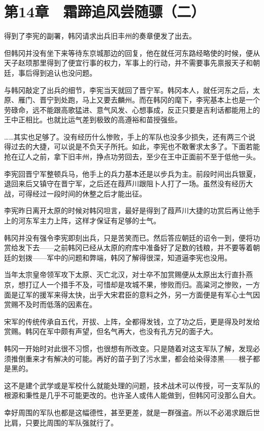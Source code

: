 \section{第14章　霜蹄追风尝随骠（二）}

得到了李宪的副署，韩冈请求出兵旧丰州的奏章便发了出去。

但韩冈并没有坐下来等待东京城那边的回复，他在就任河东路经略使的时候，便从天子赵顼那里得到了便宜行事的权力，军事上的行动，并不需要事先禀报天子和朝廷，事后得到追认也没问题。

与韩冈敲定了出兵的细节，李宪当天就回了晋宁军。韩冈本人，就任河东之后，太原、雁门、晋宁到处跑，马上又要去麟州。而在韩冈的麾下，李宪基本上也是一个劳碌命，远不能跟高歌猛进、意气风发、心想事成，反正只要是吉利话都能用上的王中正相比。也就比运气差到极致的高遵裕和苗授强些。

……其实也足够了。没有经历什么惨败，手上的军队也没多少损失，还有两三个说得过去的大捷，可以说是不负天子所托。如此，李宪也不敢奢求太多了。下面若能抢在辽人之前，拿下旧丰州，挣点功劳回去，至少在王中正面前不至于低他一头。

李宪回晋宁军整顿兵马，他手上的兵力基本还是以步兵为主。前段时间出兵银夏，退回来后又镇守在晋宁军，之后还在葭芦川跟阻卜人打了一场。虽然没有经历大战，可得经过一段时间的休整之后才能出征。

李宪昨日离开太原的时候对韩冈坦言，最好是得到了葭芦川大捷的功赏后再让他手上的河东军主力上阵，这样才保证有足够的士气。

韩冈并没有强令李宪即刻出兵，只是苦笑而已。然后答应朝廷的诏令一到，便将功赏给发下去——之前韩冈已经从太原的府库中准备好了足数的钱粮，并不要等着朝廷的划拨——军中的问题和弊端，韩冈了解得很深，知道逼李宪也没用。

当年太宗皇帝领军攻下太原、灭亡北汉，对士卒不加赏赐便从太原出太行直扑燕京，想打辽人一个措手不及，可惜却是攻城不果，惨败而归。高粱河之惨败，一方面是辽军的援军来得太快，出乎大宋君臣的意料之外，另一方面便是有军心士气因赏赐不及时而低落的因素在。

宋军的传统传承自五代，开拔、上阵，全都得发钱，立了功之后，更是得及时发给赏赐。韩冈在军中颇有声望，但名气再大，也没有孔方兄的面子大。

韩冈一开始时对此很不习惯，也很想有所改变。只是随着对这支军队了解，发现必须推倒重来才有解决的可能。再好的苗子到了污水里，都会给染得漆黑——根子都是黑的。

这不是建个武学或是军校什么就能处理的问题，技术战术可以传授，可一支军队的根源和秉性是几乎不可能更改的。也许圣人或伟人能做到，但韩冈可没那么自大。

幸好周围的军队也都是这幅德性，甚至更差，就是一群强盗。所以不必渴求跟后世比肩，只要比周围的军队强就行了。

